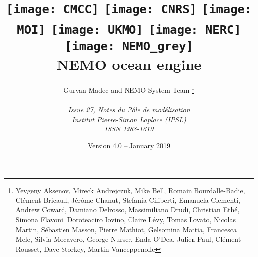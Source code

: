 \documentclass{book}
\newcommand{\biblio}{}
\newcommand{\pindex}{\printindex}
\begin{document}
\renewcommand{\biblio}{}
\renewcommand{\pindex}{}



\title{
  \texttt{[image: CMCC]}\hfill
  \texttt{[image: CNRS]}\hfill
  \texttt{[image: MOI]} \hfill
  \texttt{[image: UKMO]}\hfill
  \texttt{[image: NERC]}       \\
  \texttt{[image: NEMO\_grey]}  \\
  {\Huge NEMO ocean engine}                            \\
}
\author{
  \Large Gurvan Madec and NEMO System Team
  \thanks{
    Yevgeny Aksenov, Mireck Andrejczuk, Mike Bell, Romain Bourdalle-Badie, Cl\'{e}ment Bricaud,
    J\'{e}r\^{o}me Chanut, Stefania Ciliberti, Emanuela Clementi, Andrew Coward, Damiano Delrosso,
    Massimiliano Drudi, Christian Eth\'{e}, Simona Flavoni, Doroteaciro Iovino, Claire L\'{e}vy, Tomas Lovato,
    Nicolas Martin, S\'{e}bastien Masson, Pierre Mathiot, Gelsomina Mattia, Francesca Mele, Silvia Mocavero,
    George Nurser, Enda O'Dea, Julien Paul, Cl\'{e}ment Rousset, Dave Storkey, Martin Vancoppenolle
  }                                                        \\
                                                           \\
  \textit{Issue 27, Notes du P\^{o}le de mod\'{e}lisation} \\
  \textit{Institut Pierre-Simon Laplace (IPSL)}            \\
  \textit{ISSN 1288-1619}
}
\date{Version 4.0 -- January 2019}

\maketitle
\frontmatter


\dominitoc
\tableofcontents



\mainmatter




\end{document}
